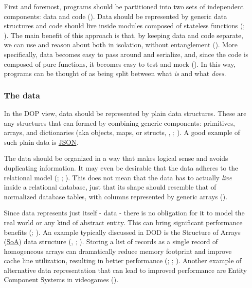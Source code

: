 \documentclass[
]{book}
\theoremstyle{definition}
\theoremstyle{definition}
\theoremstyle{definition}
\theoremstyle{definition}
\theoremstyle{remark}
\begin{document}
First and foremost, programs should be partitioned into two sets of independent components: data and code (). Data should be represented by generic data structures and code should live inside modules composed of stateless functions (; ). The main benefit of this approach is that, by keeping data and code separate, we can use and reason about both in isolation, without entanglement (). More specifically, data becomes easy to pass around and serialize, and, since the code is composed of pure functions, it becomes easy to test and mock (). In this way, programs can be thought of as being split between what \emph{is} and what \emph{does}.

\subsubsection{The data}\label{the-data}

In the DOP view, data should be represented by plain data structures. These are any structures that can formed by combining generic components: primitives, arrays, and dictionaries (aka objects, maps, or structs, , ; ). A good example of such plain data is \hyperref[JSON]{JSON}.

The data should be organized in a way that makes logical sense and avoids duplicating information. It may even be desirable that the data adheres to the relational model (; ; ). This does not mean that the data has to actually \emph{live} inside a relational database, just that its shape should resemble that of normalized database tables, with columns represented by generic arrays ().

Since data represents just itself - data - there is no obligation for it to model the real world or any kind of abstract entity. This can bring significant performance benefits (; ). An example typically discussed in DOD is the Structure of Arrays (\hyperref[SoA]{SoA}) data structure (, ; ). Storing a list of records as a single record of homogeneous arrays can dramatically reduce memory footprint and improve cache line utilization, resulting in better performance (; ; ). Another example of alternative data representation that can lead to improved performance are Entity Component Systems in videogames ().
\end{document}
